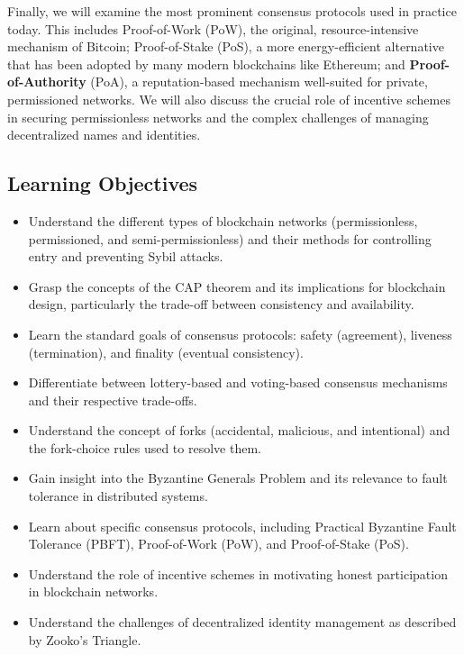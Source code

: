 Finally, we will examine the most prominent consensus protocols used in
practice today. This includes Proof-of-Work (PoW), the original,
resource-intensive mechanism of Bitcoin; Proof-of-Stake (PoS), a more
energy-efficient alternative that has been adopted by many modern
blockchains like Ethereum; and \textbf{Proof-of-Authority} (PoA), a
reputation-based mechanism well-suited for private, permissioned
networks. We will also discuss the crucial role of incentive schemes in
securing permissionless networks and the complex challenges of managing
decentralized names and identities.

\subsection{Learning Objectives}\label{learning-objectives}

\begin{itemize}
	\tightlist
	\item
	Understand the different types of blockchain networks (permissionless,
	permissioned, and semi-permissionless) and their methods for
	controlling entry and preventing Sybil attacks.
	\item
	Grasp the concepts of the CAP theorem and its implications for
	blockchain design, particularly the trade-off between consistency and
	availability.
	\item
	Learn the standard goals of consensus protocols: safety (agreement),
	liveness (termination), and finality (eventual consistency).
	\item
	Differentiate between lottery-based and voting-based consensus
	mechanisms and their respective trade-offs.
	\item
	Understand the concept of forks (accidental, malicious, and
	intentional) and the fork-choice rules used to resolve them.
	\item
	Gain insight into the Byzantine Generals Problem and its relevance to
	fault tolerance in distributed systems.
	\item
	Learn about specific consensus protocols, including Practical
	Byzantine Fault Tolerance (PBFT), Proof-of-Work (PoW), and
	Proof-of-Stake (PoS).
	\item
	Understand the role of incentive schemes in motivating honest
	participation in blockchain networks.
	\item
	Understand the challenges of decentralized identity management as
	described by Zooko's Triangle.
\end{itemize}

